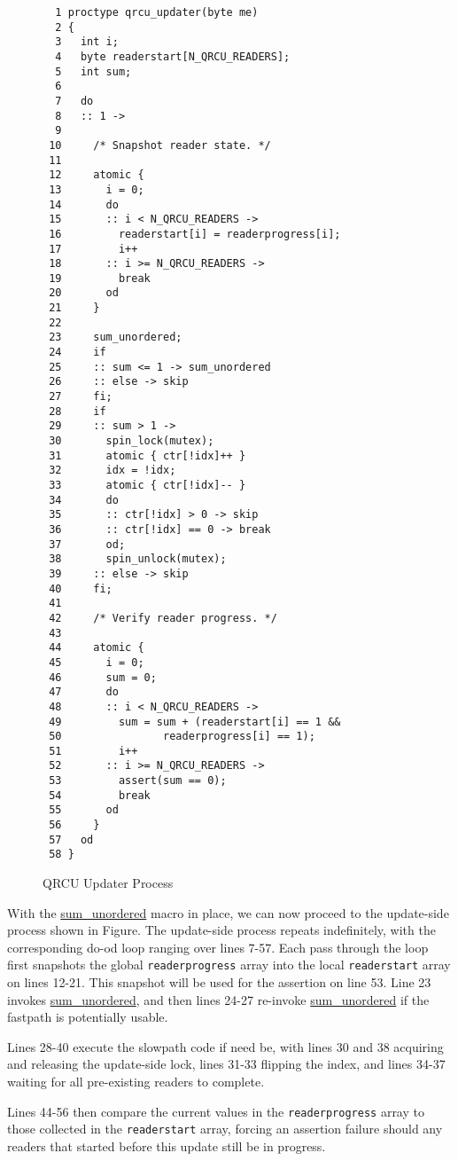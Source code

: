 \begin{figure}[htbp]
{ \scriptsize
\begin{verbatim}
  1 proctype qrcu_updater(byte me)
  2 {
  3   int i;
  4   byte readerstart[N_QRCU_READERS];
  5   int sum;
  6
  7   do
  8   :: 1 ->
  9
 10     /* Snapshot reader state. */
 11
 12     atomic {
 13       i = 0;
 14       do
 15       :: i < N_QRCU_READERS ->
 16         readerstart[i] = readerprogress[i];
 17         i++
 18       :: i >= N_QRCU_READERS ->
 19         break
 20       od
 21     }
 22
 23     sum_unordered;
 24     if
 25     :: sum <= 1 -> sum_unordered
 26     :: else -> skip
 27     fi;
 28     if
 29     :: sum > 1 ->
 30       spin_lock(mutex);
 31       atomic { ctr[!idx]++ }
 32       idx = !idx;
 33       atomic { ctr[!idx]-- }
 34       do
 35       :: ctr[!idx] > 0 -> skip
 36       :: ctr[!idx] == 0 -> break
 37       od;
 38       spin_unlock(mutex);
 39     :: else -> skip
 40     fi;
 41
 42     /* Verify reader progress. */
 43
 44     atomic {
 45       i = 0;
 46       sum = 0;
 47       do
 48       :: i < N_QRCU_READERS ->
 49         sum = sum + (readerstart[i] == 1 &&
 50                readerprogress[i] == 1);
 51         i++
 52       :: i >= N_QRCU_READERS ->
 53         assert(sum == 0);
 54         break
 55       od
 56     }
 57   od
 58 }
\end{verbatim}
}
\caption{QRCU Updater Process}
\label{fig:analysis:QRCU Updater Process}
\end{figure}

With the \url{sum_unordered} macro in place, we can now proceed
to the update-side process shown in
Figure.
The update-side process repeats indefinitely, with the corresponding
do-od loop ranging over lines 7-57.
Each pass through the loop first snapshots the global {\tt readerprogress}
array into the local {\tt readerstart} array on lines 12-21.
This snapshot will be used for the assertion on line 53.
Line 23 invokes \url{sum_unordered}, and then lines 24-27
re-invoke \url{sum_unordered} if the fastpath is potentially
usable.

Lines 28-40 execute the slowpath code if need be, with
lines 30 and 38 acquiring and releasing the update-side lock,
lines 31-33 flipping the index, and lines 34-37 waiting for
all pre-existing readers to complete.

Lines 44-56 then compare the current values in the {\tt readerprogress}
array to those collected in the {\tt readerstart} array,
forcing an assertion failure should any readers that started before
this update still be in progress.

